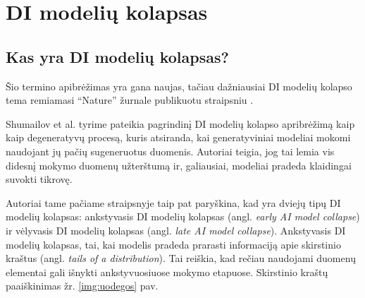 \documentclass{VUMIFInfKursinis}
\begin{document}
\section{DI modelių kolapsas}


\subsection{Kas yra DI modelių kolapsas?}
Šio termino apibrėžimas yra gana naujas, tačiau dažniausiai DI modelių kolapso tema remiamasi \enquote{Nature} žurnale publikuotu straipsniu \cite{AICollapseNature}.

Shumailov et al. tyrime \cite{AICollapseNature} pateikia pagrindinį DI modelių kolapso apribrėžimą kaip kaip degeneratyvų procesą, kuris atsiranda, kai generatyviniai modeliai mokomi naudojant jų pačių sugeneruotus duomenis. Autoriai teigia, jog tai lemia vis didesnį mokymo duomenų užterštumą ir, galiausiai, modeliai pradeda klaidingai suvokti tikrovę.

Autoriai tame pačiame straipsnyje taip pat paryškina, kad yra dviejų tipų DI modelių kolapsas: ankstyvasis DI modelių kolapsas (angl. \textsl{early AI model collapse}) ir vėlyvasis DI modelių kolapsas (angl. \textsl{late AI model collapse}). Ankstyvasis DI modelių kolapsas, tai, kai modelis pradeda prarasti informaciją apie skirstinio kraštus (angl. \textsl{tails of a distribution}). Tai reiškia, kad rečiau naudojami duomenų elementai gali išnykti ankstyvuosiuose mokymo etapuose. Skirstinio kraštų paaiškinimas žr. \ref{img:uodegos} pav. 
\end{document}
